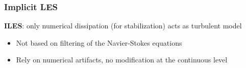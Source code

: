 \begin{frame}
\frametitle{Implicit LES}
\vfill
\textbf{ILES}: only numerical dissipation (for stabilization) acts as turbulent model
\begin{overprint}
\begin{itemize}
\item Not based on filtering of the Navier-Stokes equations
\item Rely on numerical artifacts, no modification at the continuous level
\end{itemize}
\end{overprint}
\vfill
\end{frame}